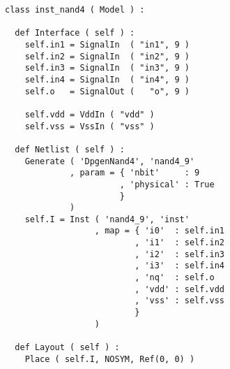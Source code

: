 \begin{itemize}
\begin{verbatim}
class inst_nand4 ( Model ) :

  def Interface ( self ) :
    self.in1 = SignalIn  ( "in1", 9 )
    self.in2 = SignalIn  ( "in2", 9 )
    self.in3 = SignalIn  ( "in3", 9 )
    self.in4 = SignalIn  ( "in4", 9 )
    self.o   = SignalOut (   "o", 9 )

    self.vdd = VddIn ( "vdd" )
    self.vss = VssIn ( "vss" )
    
  def Netlist ( self ) :
    Generate ( 'DpgenNand4', 'nand4_9'
             , param = { 'nbit'     : 9
                       , 'physical' : True
                       }
             )
    self.I = Inst ( 'nand4_9', 'inst'
                  , map = { 'i0'  : self.in1
                          , 'i1'  : self.in2
                          , 'i2'  : self.in3
                          , 'i3'  : self.in4
                          , 'nq'  : self.o
                          , 'vdd' : self.vdd
                          , 'vss' : self.vss
                          }
                  )
    
  def Layout ( self ) :
    Place ( self.I, NOSYM, Ref(0, 0) )
\end{verbatim}
\end{itemize}
